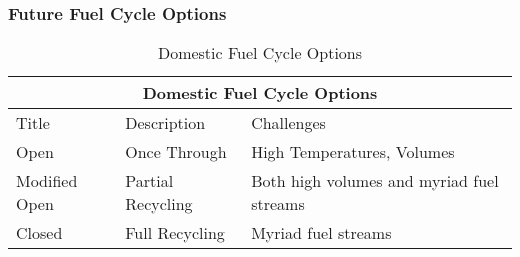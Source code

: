 

\begin{frame}[ctb!]
  \frametitle{Future Fuel Cycle Options}
    \begin{table}
      \centering
      \footnotesize{
      \begin{tabular}{|l|l|l|}
        \multicolumn{3}{c}{\textbf{Domestic Fuel Cycle Options}}\\
        \hline
        Title & Description& Challenges \\
        \hline
        Open          & Once Through      & High Temperatures, Volumes \\
        Modified Open & Partial Recycling & Both high volumes and myriad fuel streams \\
        Closed        & Full Recycling    & Myriad fuel streams \\
        \hline
      \end{tabular}
      \caption[Fuel Cycle Options]{Domestic Fuel Cycle Options }
      \label{tab:fco}
      }
    \end{table}
\end{frame}

